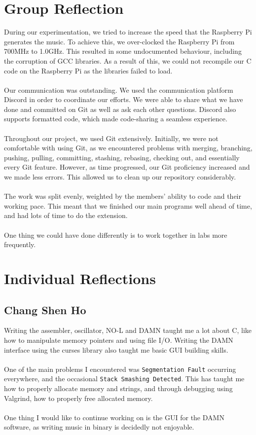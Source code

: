\documentclass[11pt]{article}
\begin{document}
\section{Group Reflection}
During our experimentation, we tried to increase the speed that the Raspberry Pi generates the music. To achieve this, we over-clocked the Raspberry Pi from 700MHz to 1.0GHz. This resulted in some undocumented behaviour, including the corruption of GCC libraries. As a result of this, we could not recompile our C code on the Raspberry Pi as the libraries failed to load. \\\\
Our communication was outstanding. We used the communication platform Discord in order to coordinate our efforts. We were able to share what we have done and committed on Git as well as ask each other questions. Discord also supports formatted code, which made code-sharing a seamless experience.\\\\
Throughout our project, we used Git extensively. Initially, we were not comfortable with using Git, as we encountered problems with merging, branching, pushing, pulling, committing, stashing, rebasing, checking out, and essentially every Git feature. However, as time progressed, our Git proficiency increased and we made less errors. This allowed us to clean up our repository considerably. \\\\
The work was split evenly, weighted by the members' ability to code and their working pace. This meant that we finished our main programs well ahead of time, and had lots of time to do the extension.\\\\
One thing we could have done differently is to work together in labs more frequently.

\section{Individual Reflections}
\subsection{Chang Shen Ho}
Writing the assembler, oscillator, NO-L and DAMN taught me a lot about C, like how to manipulate memory pointers and using file I/O. Writing the DAMN interface using the curses library also taught me basic GUI building skills.\\\\
One of the main problems I encountered was \texttt{Segmentation Fault} occurring everywhere, and the occasional \texttt{Stack Smashing Detected}. This has taught me how to properly allocate memory and strings, and through debugging using Valgrind, how to properly free allocated memory.\\\\
One thing I would like to continue working on is the GUI for the DAMN software, as writing music in binary is decidedly not enjoyable.
\end{document}
